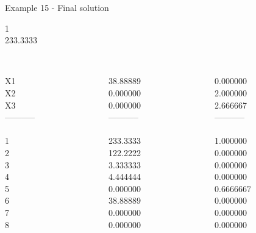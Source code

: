 \begin{frame}{Example 15 - Final solution}

 1 \\
  233.3333\\

\begin{columns}[t]
\begin{column}{0.3\textwidth}
\\
X1\\
X2\\
X3\\
-----------\\
\\
1\\
2\\
3\\
4\\
5\\
6\\
7\\
8\\

\end{column}
\begin{column}{0.3\textwidth}
\\
38.88889\\
0.000000\\
0.000000\\

-----------\\
\\
233.3333\\
122.2222\\
3.333333\\
4.444444\\
0.000000\\
38.88889\\
0.000000\\
0.000000\\

\end{column}  

\begin{column}{0.3\textwidth}
\\
0.000000\\
2.000000\\
2.666667\\

-----------\\
\\
1.000000\\
0.000000\\
0.000000\\
0.000000\\
0.6666667\\
0.000000\\
0.000000\\
0.000000\\
\end{column}
\end{columns}  
\end{frame}
